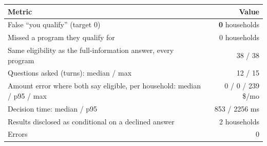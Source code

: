 \begin{tabular}{lr}
\toprule
Metric & Value \\
\midrule
False ``you qualify'' (target 0) & \textbf{0} households \\
Missed a program they qualify for & 0 households \\
Same eligibility as the full-information answer, every program & 38 / 38 \\
Questions asked (turns): median / max & 12 / 15 \\
Amount error where both say eligible, per household: median / p95 / max & 0 / 0 / 239 \$/mo \\
Decision time: median / p95 & 853 / 2256 ms \\
Results disclosed as conditional on a declined answer & 2 households \\
Errors & 0 \\
\bottomrule
\end{tabular}
